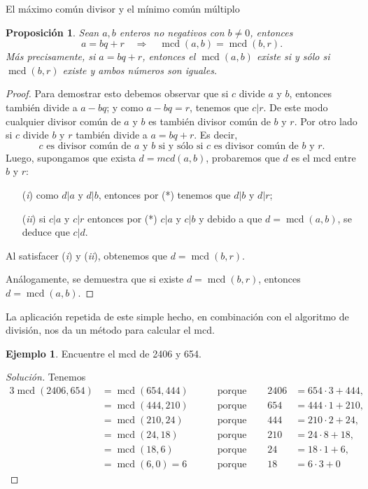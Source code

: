 \documentclass[11pt,spanish,makeidx]{amsbook}
\newtheorem{proposicion}[teorema]{Proposici\'on}
\theoremstyle{definition}
\newtheorem{ejemplo}{Ejemplo}[section]
\theoremstyle{remark}
\newcommand \mcd{\operatorname{mcd}}
\begin{document}
\begin{section}{El máximo común divisor y el mínimo común múltiplo}
\begin{proposicion}\label{prop-alg-eucl} Sean  $a,b$ enteros no negativos con $b \not=0$, entonces 
\begin{equation}\label{bec}
a=bq+r\quad \Rightarrow \quad\mcd(a,b)=\mcd(b,r).
\end{equation}
Más precisamente, si $a = bq + r$, entonces el $\mcd(a,b)$ existe si y sólo si  $\mcd(b,r)$ existe y ambos números son iguales.
\end{proposicion}
\begin{proof}
Para demostrar esto debemos observar que si $c$ divide $a$ y $b$, entonces también divide a $a-bq$; y como $a-bq=r$, tenemos que $c|r$. De este modo cualquier divisor común de $a$ y $b$ es también divisor común de $b$ y $r$.  Por otro lado si $c$ divide $b$ y $r$ también divide a $a=bq+r$. Es decir, 
\begin{equation}\label{eqmcd1}
\text{$c$ es divisor común de $a$ y $b$ si y sólo si $c$ es divisor común de $b$ y $r$.} \tag{*}
\end{equation}
Luego, supongamos que  exista $d = mcd(a,b)$, probaremos que $d$ es el mcd entre $b$ y $r$:
\begin{enumerate}
\item[({\em i})] como $d|a$ y $d|b$, entonces por (*) tenemos que $ d|b$ y $d|r$;
\item[({\em ii})] si $c|a $ y $c|r$ entonces por (*)  $c|a$ y $c|b$ y debido a que $d = \mcd(a,b)$, se deduce que $c|d$.
\end{enumerate}
Al satisfacer ({\em i}) y ({\em ii}), obtenemos que $d = \mcd(b,r)$.

Análogamente, se demuestra que si existe $d = \mcd(b,r)$, entonces  $d = \mcd(a,b)$.
\end{proof}

La aplicación repetida de este simple hecho, en combinación con el algoritmo de división, nos da un método para calcular el mcd.

\begin{ejemplo} Encuentre el mcd de 2406 y 654.
\end{ejemplo}
\begin{proof}[Solución] Tenemos
\begin{alignat*}3
\mcd(2406,654)&=\mcd(654,444)&\quad &\text{ porque }\quad& 2406&=654\cdot3+444,\\
               &=\mcd(444,210)& &\text{ porque }\quad& 654&=444\cdot1+210,\\
               &=\mcd(210,24)&& \text{ porque }\quad &444&=210\cdot2+24,\\
               &=\mcd(24,18) && \text{ porque }\quad &210&=24\cdot8+18,\\
               &=\mcd(18,6)  && \text{ porque }\quad &24 &=18\cdot1+6,\\
               & =\mcd(6,0) = 6           &&\text{ porque }\quad&18&=6\cdot3 + 0
\end{alignat*}


\end{proof}
\end{section}
\end{document}
